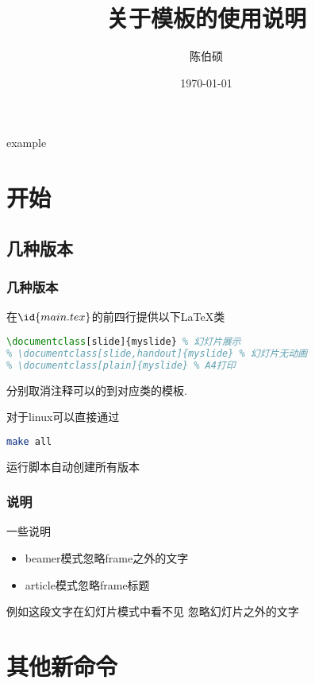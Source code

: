 \documentclass[slide]{myslide} %
\title{关于模板的使用说明}
\date{\today}
\author{陈伯硕}
\institute{github}
\begin{document}
\begin{frame}
	\maketitle
\end{frame}

\begin{frame}{example}
	\tableofcontents
\end{frame}

\section{开始}

\subsection{几种版本}

\begin{frame}[fragile]
  \frametitle{几种版本}
		在$\id{main.tex}$的前四行提供以下\LaTeX 类

\begin{lstlisting}[language=tex]
% \documentclass[ebook]{myslide} % 移动设备
\documentclass[slide]{myslide} % 幻灯片展示
% \documentclass[slide,handout]{myslide} % 幻灯片无动画
% \documentclass[plain]{myslide} % A4打印
\end{lstlisting}
	分别取消注释可以的到对应类的模板.

	对于linux可以直接通过
\begin{lstlisting}[language=bash]
make all
\end{lstlisting}
	运行脚本自动创建所有版本

\end{frame}

\subsubsection{说明}

	\begin{frame}{一些说明}
		\begin{itemize}
			\item beamer模式忽略frame之外的文字
			\item article模式忽略frame标题
		\end{itemize}

	\end{frame}
	例如这段文字在幻灯片模式中看不见
	忽略幻灯片之外的文字

\section{其他新命令}
\end{document}
